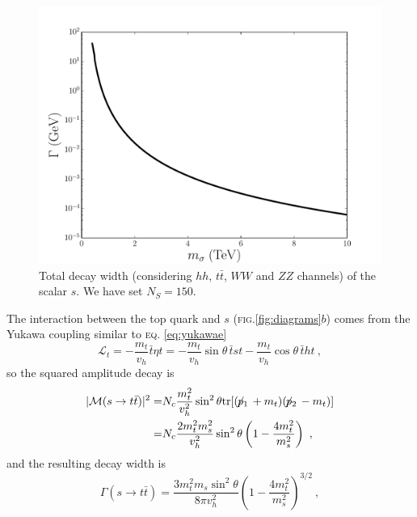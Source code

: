\documentclass[aps,prd,preprintnumbers,nofootinbibn,twocolumn]{revtex4}
\newcommand{\tr}{\mathrm{tr}}
\newcommand{\sla}[1]{\!\not\!#1\,}
\begin{document}
\begin{figure}[b]
\centering
\includegraphics[width=\columnwidth]{totalwidth}
\caption{Total decay width (considering $hh$, $t\bar{t}$, $WW$ and $ZZ$ channels) of the scalar $s$. We have set $N_S=150$.}\label{fig:totalwidth}
\end{figure}

The interaction between the top quark and $s$ (\textsc{fig.}\ref{fig:diagrams}$b$) comes from the Yukawa coupling similar to \textsc{eq.} \eqref{eq:yukawae}
\begin{equation}
\mathcal{L}_t = -\frac{m_t}{v_h}\bar{t}\eta t=  -\frac{m_t}{v_h}\sin\theta\, \bar{t} s t-\frac{m_t}{v_h}\cos\theta\, \bar{t} h t\ ,
\end{equation}
so the squared amplitude decay is 
\begin{align}
|\mathcal{M}(s\to t\bar{t})|^2 =& N_c \frac{m_t^2}{v_h^2}\sin^2\theta \tr[(\sla{p_1} + m_t)(\sla{p_2}-m_t)]\nonumber\\
=& N_c \frac{2 m_t^2 m_s^2 }{v_h^2} \sin^2 \theta \left(1-\frac{4 m_t^2}{m_s^2}\right)\ ,
\end{align}
and the resulting decay width is
\begin{equation}
\Gamma(s \to t \bar{t})= \frac{3 m_t^2 m_s \sin^2\theta}{8\pi  v_h^2} \left(1-\frac{4 m_t^2}{m_s^2}\right)^{3/2} \ ,
\end{equation}
\end{document}
